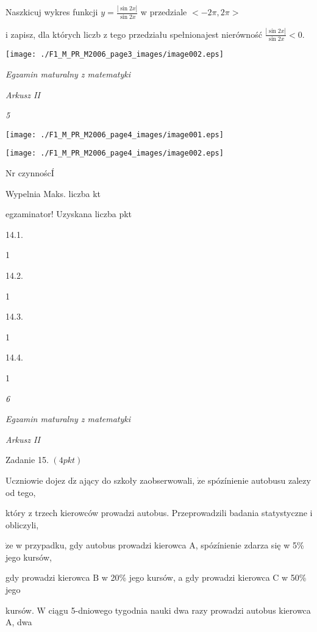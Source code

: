 \documentclass[a4paper,12pt]{article}
\begin{document}
Naszkicuj wykres funkcji $y=\displaystyle \frac{|\sin 2x|}{\sin 2x}$ w przedziale $<-2\pi,2\pi>$

i zapisz, dla których liczb z tego przedziału spełnionajest nierówność $\displaystyle \frac{|\sin 2x|}{\sin 2x}<0.$
\begin{center}
\texttt{[image: ./F1\_M\_PR\_M2006\_page3\_images/image002.eps]}
\end{center}




{\it Egzamin maturalny z matematyki}

{\it Arkusz II}

{\it 5}
\begin{center}
\texttt{[image: ./F1\_M\_PR\_M2006\_page4\_images/image001.eps]}

\texttt{[image: ./F1\_M\_PR\_M2006\_page4\_images/image002.eps]}
\end{center}
Nr czynnoścÍ

Wypelnia Maks. liczba kt

egzaminator! Uzyskana liczba pkt

14.1.

1

14.2.

1

14.3.

1

14.4.

1





{\it 6}

{\it Egzamin maturalny z matematyki}

{\it Arkusz II}

Zadanie 15. $(4pkt)$

Uczniowie dojez $\mathrm{d}\dot{\mathrm{z}}$ ający do szkoły zaobserwowali, $\dot{\mathrm{z}}\mathrm{e}$ spózínienie autobusu zalez$\mathrm{y}$ od tego,

który z trzech kierowców prowadzi autobus. Przeprowadzili badania statystyczne i obliczyli,

$\dot{\mathrm{z}}\mathrm{e}$ w przypadku, gdy autobus prowadzi kierowca $\mathrm{A}$, spózínienie zdarza się w 5\% jego kursów,

gdy prowadzi kierowca $\mathrm{B}$ w 20\% jego kursów, a gdy prowadzi kierowca $\mathrm{C}$ w 50\% jego

kursów. $\mathrm{W}$ ciągu 5-dniowego tygodnia nauki dwa razy prowadzi autobus kierowca $\mathrm{A}$, dwa
\end{document}
